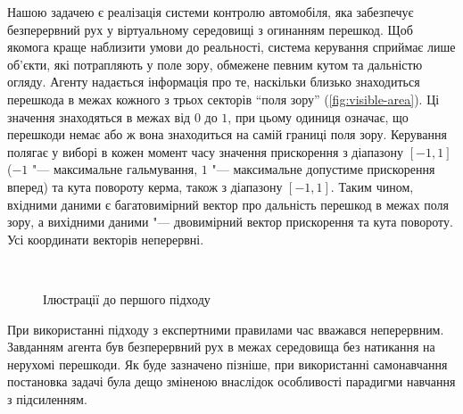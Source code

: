 \documentclass[a4paper,10pt,fleqn]{article}
\begin{document}
Нашою задачею є реалізація системи контролю автомобіля, яка забезпечує безперервний рух у віртуальному середовищі з огинанням перешкод. Щоб якомога краще наблизити умови до реальності, система керування сприймає лише об'єкти, які потрапляють у поле зору, обмежене певним кутом та дальністю огляду. Агенту надається інформація про те, наскільки близько знаходиться перешкода в межах кожного з трьох секторів ``поля зору'' (\ref{fig:visible-area}). Ці значення знаходяться в межах від $0$ до $1$, при цьому одиниця означає, що перешкоди немає або ж вона знаходиться на самій границі поля зору. Керування полягає у виборі в кожен момент часу значення прискорення з діапазону $[-1,1]$ ($-1$ "--- максимальне гальмування, $1$ "--- максимальне допустиме прискорення вперед) та кута повороту керма, також з діапазону $[-1,1]$. Таким чином, вхідними даними є багатовимірний вектор про дальність перешкод в межах поля зору, а вихідними даними "--- двовимірний вектор прискорення та кута повороту. Усі координати векторів неперервні. 
\begin{figure}
  \centering
  \,
  \caption{Ілюстрації до першого підходу}
  \label{fig:car-related}
\end{figure}

При використанні підходу з експертними правилами час вважався неперервним. Завданням агента був безперервний рух в межах середовища без натикання на нерухомі перешкоди. Як буде зазначено пізніше, при використанні самонавчання постановка задачі була дещо зміненою внаслідок особливості парадигми навчання з підсиленням.
\end{document}
